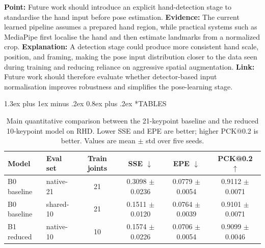 \documentclass[10pt,letterpaper]{article}
\makeatletter
\renewcommand\section{\@startsection{section}{1}{\z@}%
  {1.3ex plus 1ex minus .2ex}%
  {0.8ex plus .2ex}%
  {\centering\normalfont\small\scshape}}
\makeatother
\begin{document}
\medskip
\noindent\textbf{Point:} Future work should introduce an explicit hand-detection stage to standardise the hand input before pose estimation.
\textbf{Evidence:} The current learned pipeline assumes a prepared hand region, while practical systems such as MediaPipe first localise the hand and then estimate landmarks from a normalized crop.
\textbf{Explanation:} A detection stage could produce more consistent hand scale, position, and framing, making the pose input distribution closer to the data seen during training and reducing reliance on aggressive spatial augmentation.
\textbf{Link:} Future work should therefore evaluate whether detector-based input normalisation improves robustness and simplifies the pose-learning stage.

\clearpage
\onecolumn
\section*{TABLES}

\begin{table}[H]
\centering
\footnotesize
\caption{Main quantitative comparison between the 21-keypoint baseline and the reduced 10-keypoint model on RHD. Lower SSE and EPE are better; higher PCK@0.2 is better. Values are mean $\pm$ std over five seeds.}
\label{tab:main_accuracy}
\begin{tabular}{llcccc}
\toprule
Model & Eval set & Train joints & SSE $\downarrow$ & EPE $\downarrow$ & PCK@0.2 $\uparrow$ \\
\midrule
B0 baseline & native-21 & 21 & 0.3098 $\pm$ 0.0236 & 0.0779 $\pm$ 0.0054 & 0.9112 $\pm$ 0.0071 \\
B0 baseline & shared-10 & 21 & 0.1511 $\pm$ 0.0120 & 0.0764 $\pm$ 0.0039 & 0.9101 $\pm$ 0.0071 \\
B1 reduced & native-10 & 10 & 0.1574 $\pm$ 0.0226 & 0.0706 $\pm$ 0.0054 & 0.9099 $\pm$ 0.0046 \\
\bottomrule
\end{tabular}
\end{table}
\end{document}
